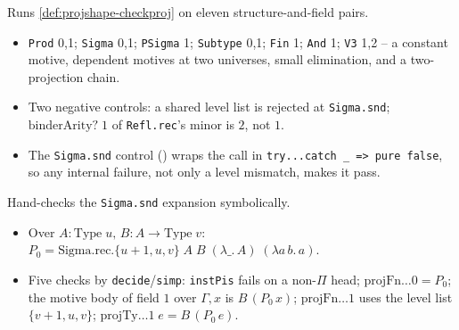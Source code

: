\begin{example}
  \label{test:projshape-run}
  \leanok

   Runs \ref{def:projshape-checkproj} on eleven structure-and-field pairs.
  \begin{itemize}
  \item \texttt{Prod} 0,1; \texttt{Sigma} 0,1; \texttt{PSigma} 1; \texttt{Subtype} 0,1;
        \texttt{Fin} 1; \texttt{And} 1; \texttt{V3} 1,2 -- a constant motive, dependent motives at
        two universes, small elimination, and a two-projection chain.
  \item Two negative controls: a shared level list is rejected at \texttt{Sigma.snd};
        $\mathrm{binderArity?}\;1$ of \texttt{Refl.rec}'s minor is $2$, not $1$.
  \item {} The \texttt{Sigma.snd} control ()
        wraps the call in \texttt{try...catch \_ => pure false}, so any internal failure, not only
        a level mismatch, makes it pass.
  \end{itemize}
\end{example}

\begin{example}
  \label{test:projshape-sigmasnd}
  \leanok

   Hand-checks the \texttt{Sigma.snd} expansion symbolically.
  \begin{itemize}
  \item Over $A:\mathrm{Type}\;u,\,B:A\to\mathrm{Type}\;v$: $P_0 =
        \mathrm{Sigma.rec}.\{u+1,u,v\}\;A\;B\;(\lambda \_.\,A)\;(\lambda a\,b.\,a)$.
  \item Five checks by \texttt{decide}/\texttt{simp}: \texttt{instPis} fails on a non-$\Pi$ head;
        $\mathrm{projFn}\dots 0=P_0$; the motive body of field $1$ over $\Gamma,x$ is $B\,(P_0\,x)$;
        $\mathrm{projFn}\dots 1$ uses the level list $\{v+1,u,v\}$; $\mathrm{projTy}\dots 1\;e=
        B\,(P_0\,e)$.
  \end{itemize}
\end{example}

